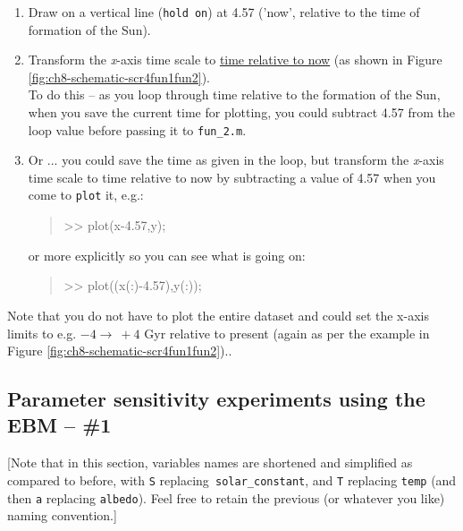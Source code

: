 \documentclass{tufte-book} %
\newenvironment{docspec}{\begin{quotation}\ttfamily\parskip0pt\parindent0pt\ignorespaces}{\end{quotation}}
\begin{document}
\begin{enumerate}
\vspace{-0mm}
\item Draw on a vertical line (\texttt{hold on}) at 4.57 ('now', relative to the time of formation of the Sun).
\vspace{-1mm}
\item Transform the \textit{x}-axis time scale to \uline{time relative to now} (as shown in Figure \ref{fig:ch8-schematic-scr4fun1fun2}). 
\\To do this -- as you loop through time relative to the formation of the Sun, when you save the current time for plotting, you could subtract 4.57 from the loop value before passing it to \texttt{fun\_2.m}.
\vspace{-1mm}
\item Or ... you could save the time as given in the loop, but transform the \textit{x}-axis time scale to time relative to now by subtracting a value of 4.57 when you come to \texttt{plot} it, e.g.:
\vspace{-1mm}\begin{docspec}
>> plot(x-4.57,y);
\end{docspec}\vspace{-1mm}
or more explicitly so you can see what is going on:
\vspace{-1mm}\begin{docspec}
>> plot((x(:)-4.57),y(:));
\end{docspec}\vspace{-1mm}
\end{enumerate}
Note that you do not have to plot the entire dataset and could set the x-axis limits to e.g. \(-4 \rightarrow\ +4\) Gyr relative to present (again as per the example in Figure \ref{fig:ch8-schematic-scr4fun1fun2})..


\newpage

\subsection{Parameter sensitivity experiments using the EBM -- \#1}

[Note that in this section, variables names are shortened and simplified as compared to before, with \texttt{S} replacing\texttt{ solar\_constant}, and \texttt{T} replacing \texttt{temp} (and then \texttt{a} replacing \texttt{albedo}). Feel free to retain the previous (or whatever you like) naming convention.]
\vspace{2mm}
\end{document}

